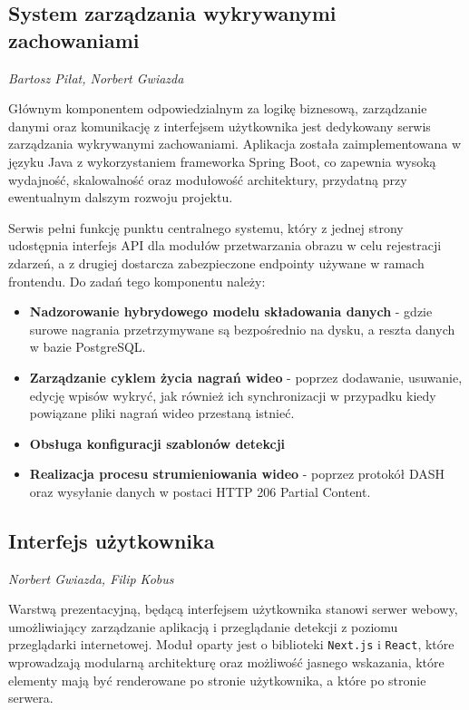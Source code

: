 \subsection{System zarządzania wykrywanymi zachowaniami}

\small \textit{Bartosz Piłat, Norbert Gwiazda}

Głównym komponentem odpowiedzialnym za logikę biznesową, zarządzanie danymi oraz komunikację z interfejsem użytkownika jest dedykowany serwis zarządzania wykrywanymi zachowaniami. Aplikacja została zaimplementowana w języku Java z wykorzystaniem frameworka Spring Boot, co zapewnia wysoką wydajność, skalowalność oraz modułowość architektury, przydatną przy ewentualnym dalszym rozwoju projektu. 

Serwis pełni funkcję punktu centralnego systemu, który z jednej strony udostępnia interfejs API dla modułów przetwarzania obrazu w celu rejestracji zdarzeń, a z drugiej dostarcza zabezpieczone endpointy używane w ramach frontendu. Do zadań tego komponentu należy:
\begin{itemize}
    \item \textbf{Nadzorowanie hybrydowego modelu składowania danych} - gdzie surowe nagrania przetrzymywane są bezpośrednio na dysku, a reszta danych w bazie PostgreSQL.
    \item \textbf{Zarządzanie cyklem życia nagrań wideo} - poprzez dodawanie, usuwanie, edycję wpisów wykryć, jak również ich synchronizacji w przypadku kiedy powiązane pliki nagrań wideo przestaną istnieć.
    \item \textbf{Obsługa konfiguracji szablonów detekcji}
    \item \textbf{Realizacja procesu strumieniowania wideo} - poprzez protokół DASH oraz wysyłanie danych w postaci HTTP 206 Partial Content.
\end{itemize}

\subsection{Interfejs użytkownika}

\small \textit{Norbert Gwiazda, Filip Kobus}

Warstwą prezentacyjną, będącą interfejsem użytkownika stanowi serwer webowy, umożliwiający zarządzanie aplikacją i przeglądanie detekcji z poziomu przeglądarki internetowej. Moduł oparty jest o biblioteki \texttt{Next.js} i \texttt{React}, które wprowadzają modularną architekturę oraz możliwość jasnego wskazania, które elementy mają być renderowane po stronie użytkownika, a które po stronie serwera.

